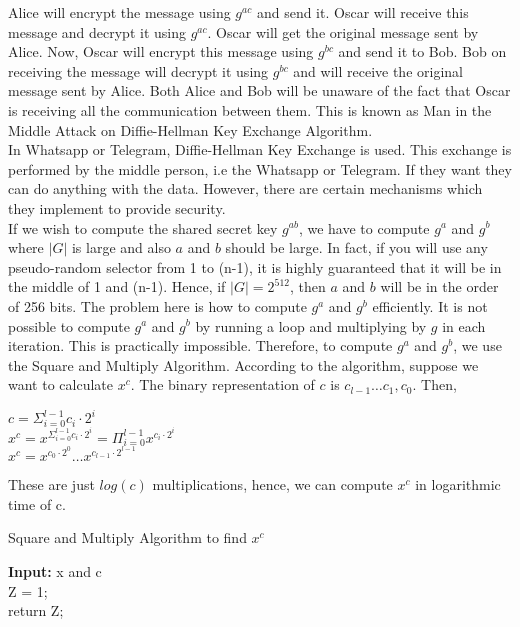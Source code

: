 \documentclass[11pt]{article}
\begin{document}
Alice will encrypt the message using $g^{ac}$ and send it. Oscar will receive this message and decrypt it using $g^{ac}$. Oscar will get the original message sent by Alice. Now, Oscar will encrypt this message using $g^{bc}$ and send it to Bob. Bob on receiving the message will decrypt it using $g^{bc}$ and will receive the original message sent by Alice. Both Alice and Bob will be unaware of the fact that Oscar is receiving all the communication between them. This is known as Man in the Middle Attack on Diffie-Hellman Key Exchange Algorithm.\\
\newline
In Whatsapp or Telegram, Diffie-Hellman Key Exchange is used. This exchange is performed by the middle person, i.e the Whatsapp or Telegram. If they want they can do anything with the data. However, there are certain mechanisms which they implement to provide security.\\
\newline
If we wish to compute the shared secret key $g^{ab}$, we have to compute $g^a$ and $g^b$ where $|G|$ is large and also $a$ and $b$ should be large. In fact, if you will use any pseudo-random selector from 1 to (n-1), it is highly guaranteed that it will be in the middle of 1 and (n-1). Hence, if $|G| = 2^{512}$, then $a$ and $b$ will be in the order of 256 bits. The problem here is how to compute $g^a$ and $g^b$ efficiently. It is not possible to compute $g^a$ and $g^b$ by running a loop and multiplying by $g$ in each iteration. This is practically impossible. Therefore, to compute $g^a$ and $g^b$, we use the Square and Multiply Algorithm. According to the algorithm, suppose we want to calculate $x^c$. The binary representation of $c$ is $c_{l-1}\hdots c_1, c_0$. Then, 
\begin{center}
    $c = \Sigma_{i = 0}^{l-1} c_i \cdot 2^i$\\
    \vspace{1mm}
    $x^c = x^{\Sigma_{i = 0}^{l-1} c_i \cdot 2^i} = \Pi_{i = 0}^{l-1} x^{c_i \cdot 2^i}$\\
    \vspace{1mm}
    $x^c = x^{c_0\cdot 2^0}\hdots x^{c_{l-1}\cdot 2^{l-1}}$
\end{center}
These are just $log(c)$ multiplications, hence, we can compute $x^c$ in logarithmic time of c.
\begin{center}
    \begin{algorithm}
    \caption{Square and Multiply Algorithm to find $x^c$}
        \textbf{Input:} x and c\\
        Z = 1;\\
        return Z;
    \end{algorithm}
\end{center}
\end{document}
